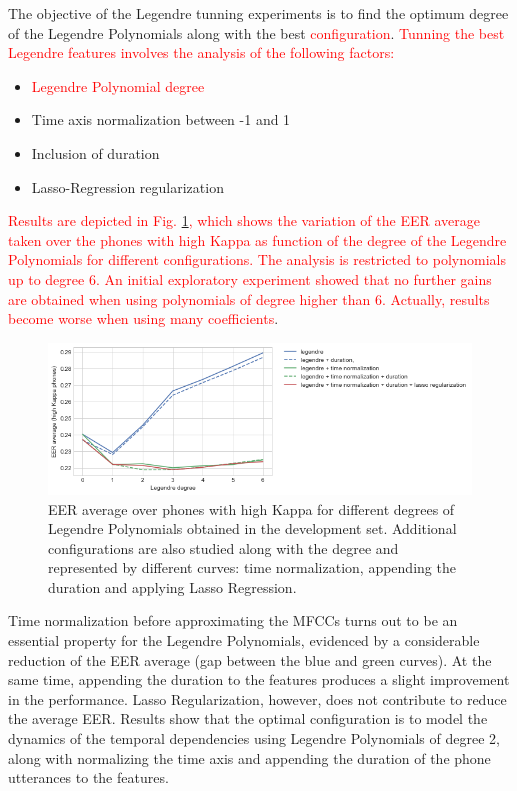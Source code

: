 The objective of the Legendre tunning experiments is to find the optimum degree of the Legendre
Polynomials along with the best \textcolor{red}{configuration}.
\textcolor{red}{
	Tunning the best Legendre features involves the analysis of
	the following factors:
}

\begin{itemize}
	\item \textcolor{red}{Legendre Polynomial degree}
	\item Time axis normalization between -1 and 1
	\item Inclusion of duration
	\item Lasso-Regression regularization
\end{itemize}

\textcolor{red}
{Results are depicted in Fig. \ref{fig:legendreTunning}, which shows the variation of the
EER average taken over the phones with high Kappa
as function of the degree of the Legendre Polynomials for different configurations.
The analysis is restricted to polynomials up to degree 6.
An initial exploratory experiment showed that no further gains are obtained when using
polynomials of degree higher than 6. Actually, results become worse when using many
coefficients}.

\begin{figure}[H]
	\centering
	\includegraphics[width=1.0\textwidth]{files/figures/results/legendre-dct/legendre-tunning.png}
	\caption{EER average over phones with high Kappa for different
	degrees of Legendre Polynomials obtained in
	the development set. Additional configurations are also studied along with the degree and
	represented by different curves: time normalization, appending the duration and applying
	Lasso Regression.}
	\label{fig:legendreTunning}
\end{figure}

Time normalization before approximating the
MFCCs turns out to be an essential property for the Legendre Polynomials, evidenced by a
considerable reduction of the EER average (gap between the blue and green curves). At the same
time, appending the duration to the features produces a slight improvement in the performance.
Lasso Regularization, however, does not contribute to reduce the average EER.
Results show that the optimal configuration is to model the dynamics of the temporal dependencies
using Legendre Polynomials of degree 2,
along with normalizing the time axis and appending the duration of the
phone utterances to the features.

